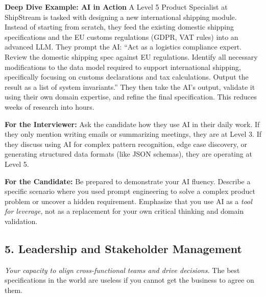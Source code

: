 \documentclass[
  11pt,
  openany,
  oneside]{book}
\renewenvironment{quote}{\begin{customquote}}{\end{customquote}}
\begin{document}
\textbf{Deep Dive Example: AI in Action} A Level 5 Product Specialist at
ShipStream is tasked with designing a new international shipping module.
Instead of starting from scratch, they feed the existing domestic
shipping specifications and the EU customs regulations (GDPR, VAT rules)
into an advanced LLM. They prompt the AI: ``Act as a logistics
compliance expert. Review the domestic shipping spec against EU
regulations. Identify all necessary modifications to the data model
required to support international shipping, specifically focusing on
customs declarations and tax calculations. Output the result as a list
of system invariants.'' They then take the AI's output, validate it
using their own domain expertise, and refine the final specification.
This reduces weeks of research into hours.

\begin{quote}
\textbf{For the Interviewer:} Ask the candidate how they use AI in their
daily work. If they only mention writing emails or summarizing meetings,
they are at Level 3. If they discuss using AI for complex pattern
recognition, edge case discovery, or generating structured data formats
(like JSON schemas), they are operating at Level 5.
\end{quote}

\begin{quote}
\textbf{For the Candidate:} Be prepared to demonstrate your AI fluency.
Describe a specific scenario where you used prompt engineering to solve
a complex product problem or uncover a hidden requirement. Emphasize
that you use AI as a \emph{tool for leverage}, not as a replacement for
your own critical thinking and domain validation.
\end{quote}

\subsection{5. Leadership and Stakeholder
Management}\label{leadership-and-stakeholder-management}

\emph{Your capacity to align cross-functional teams and drive
decisions.} The best specifications in the world are useless if you
cannot get the business to agree on them.
\end{document}
